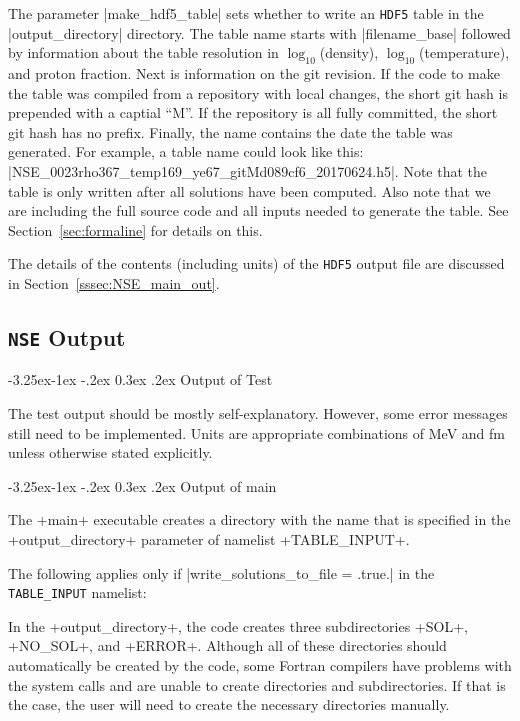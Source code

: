\documentclass[letterpaper,11pt]{refart}
\makeatletter
\renewcommand\subsubsection{\@startsection{subsubsection}{3}{\z@}%
                           {-3.25ex\@plus -1ex \@minus -.2ex}%
                           {0.3ex \@plus .2ex}%
                           {\normalfont\normalsize\bf\fontsize{11}{13}\selectfont}}
\makeatother
\begin{document}
The parameter \verbprm|make_hdf5_table| sets whether to write an 
\verb|HDF5| table in the \verbfile|output_directory| directory. 
The table name starts with \verbprm|filename_base| followed by 
information about the table resolution in $\log_{10}$(density), 
$\log_{10}$(temperature), and proton fraction. Next is information on 
the git revision. If the code to make the table was compiled from a 
repository with local changes, the short git hash is prepended with a 
captial ``M''. If the repository is all fully committed, the short git 
hash has no prefix. Finally, the name contains the date the table was
generated. For example, a table name could look like 
this: \verbfile|NSE_0023rho367_temp169_ye67_gitMd089cf6_20170624.h5|.  
Note that the table is only written after all solutions have been
computed. Also note that we are including the full source code and all
inputs needed to generate the table. See Section~\ref{sec:formaline}
for details on this.


The details of the contents (including units) of the \verb|HDF5| output file 
are discussed in Section~\ref{sssec:NSE_main_out}.


\subsection{\texttt{NSE} Output}\label{ssec:NSE_out}


\subsubsection{Output of Test}\label{sssec:SNA_test_out}


The test output should be mostly self-explanatory.  However, some
error messages still need to be implemented.  Units are appropriate
combinations of MeV and fm unless otherwise stated explicitly.


\subsubsection{Output of main}\label{sssec:NSE_main_out}


The \verbexec+main+ executable creates a directory with the name that
is specified in the \verbprm+output_directory+ parameter of namelist
\verbnml+TABLE_INPUT+.

The following applies only if \verbprm|write_solutions_to_file = .true.| in the
\texttt{\color{cyan}TABLE\_INPUT} namelist:

In the \verbprm+output_directory+, the code creates three
subdirectories \verbfile+SOL+, \verbfile+NO_SOL+, and
\verbfile+ERROR+.  Although all of these directories should
automatically be created by the code, some Fortran compilers have
problems with the system calls and are unable to create directories
and subdirectories.  If that is the case, the user will need to create
the necessary directories manually.
\end{document}
